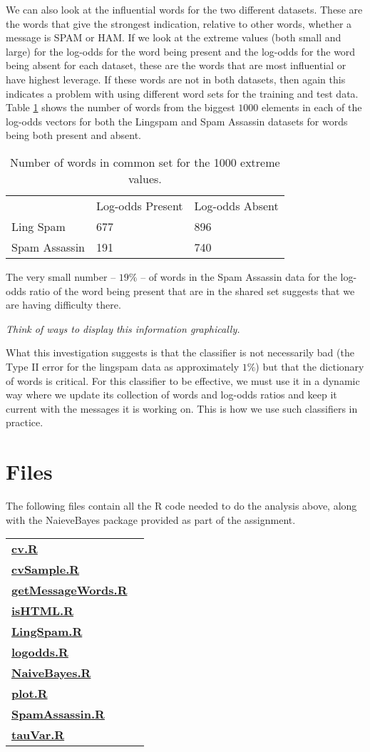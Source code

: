 \documentclass{article}
\def\file#1{\HREF{http://winnie.ucdavis.edu/stat141/Winter04/Homework/NaieveBayes/Solutions/#1}{\textbf{#1}}}
\def\HREF#1#2{\href{#1}{#2}}
\begin{document}
We can also look at the influential words for the two different
datasets.  These are the words that give the strongest indication,
relative to other words, whether a message is SPAM or HAM.  If we look
at the extreme values (both small and large) for the log-odds for the
word being present and the log-odds for the word being absent for each
dataset, these are the words that are most influential or have highest
leverage.  If these words are not in both datasets, then again this
indicates a problem with using different word sets for the training
and test data.  Table \ref{tab:CommonWordCounts} shows the number of
words from the biggest $1000$ elements in each of the log-odds vectors
for both the Lingspam and Spam Assassin datasets for words being both
present and absent.
\begin{table}[htbp]
  \begin{center}
    \leavevmode
    \begin{tabular}{lll}
&  Log-odds Present & Log-odds Absent \\
Ling Spam     & 677 &  896 \\
Spam Assassin & 191 &  740 \\
    \end{tabular}
    \caption{    Number of words in common set for the 1000 extreme values.}
    \label{tab:CommonWordCounts}
  \end{center}
\end{table}
The very small number -- $19\%$ -- of words in the Spam Assassin data
for the log-odds ratio of the word being present that are in the
shared set suggests that we are having difficulty there.

\textit{Think of ways to display this information graphically.}

What this investigation suggests is that the classifier is not
necessarily bad (the Type II error for the lingspam data as
approximately $1\%$) but that the dictionary of words is critical. For
this classifier to be effective, we must use it in a dynamic way where
we update its collection of words and log-odds ratios and keep it
current with the messages it is working on.  This is how we use such
classifiers in practice.

\section{Files}
The following files contain all the R code needed to do the analysis
above, along with the NaieveBayes package provided as part of the
assignment.
\begin{tabular}{ll}
\file{cv.R}  &  \\
\file{cvSample.R}  &  \\
\file{getMessageWords.R}  &  \\
\file{isHTML.R}  &  \\
\file{LingSpam.R}  &  \\
\file{logodds.R}  &  \\
\file{NaiveBayes.R}  &  \\
\file{plot.R}  &  \\
\file{SpamAssassin.R}  &  \\
\file{tauVar.R}  &  \\
\end{tabular}
\end{document}
